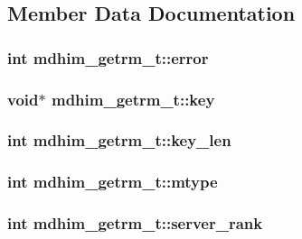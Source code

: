 \subsection{Member Data Documentation}
\hypertarget{structmdhim__getrm__t_ab5a0bbbc5c249097b7ea3c71a8c59be9}{
\subsubsection[{error}]{\setlength{\rightskip}{0pt plus 5cm}int mdhim\-\_\-getrm\-\_\-t\-::error}}\label{structmdhim__getrm__t_ab5a0bbbc5c249097b7ea3c71a8c59be9}
\hypertarget{structmdhim__getrm__t_a03ac590954131b0bd04b767115b011d2}{
\subsubsection[{key}]{\setlength{\rightskip}{0pt plus 5cm}void$\ast$ mdhim\-\_\-getrm\-\_\-t\-::key}}\label{structmdhim__getrm__t_a03ac590954131b0bd04b767115b011d2}
\hypertarget{structmdhim__getrm__t_a91f0d874ba5b81f1d22a791f4936653c}{
\subsubsection[{key\-\_\-len}]{\setlength{\rightskip}{0pt plus 5cm}int mdhim\-\_\-getrm\-\_\-t\-::key\-\_\-len}}\label{structmdhim__getrm__t_a91f0d874ba5b81f1d22a791f4936653c}
\hypertarget{structmdhim__getrm__t_af7c9cb5700c74dae330d00dcb53306a8}{
\subsubsection[{mtype}]{\setlength{\rightskip}{0pt plus 5cm}int mdhim\-\_\-getrm\-\_\-t\-::mtype}}\label{structmdhim__getrm__t_af7c9cb5700c74dae330d00dcb53306a8}
\hypertarget{structmdhim__getrm__t_ab7e6c3fdb4ba044166a37bf1e178b334}{
\subsubsection[{server\-\_\-rank}]{\setlength{\rightskip}{0pt plus 5cm}int mdhim\-\_\-getrm\-\_\-t\-::server\-\_\-rank}}\label{structmdhim__getrm__t_ab7e6c3fdb4ba044166a37bf1e178b334}
